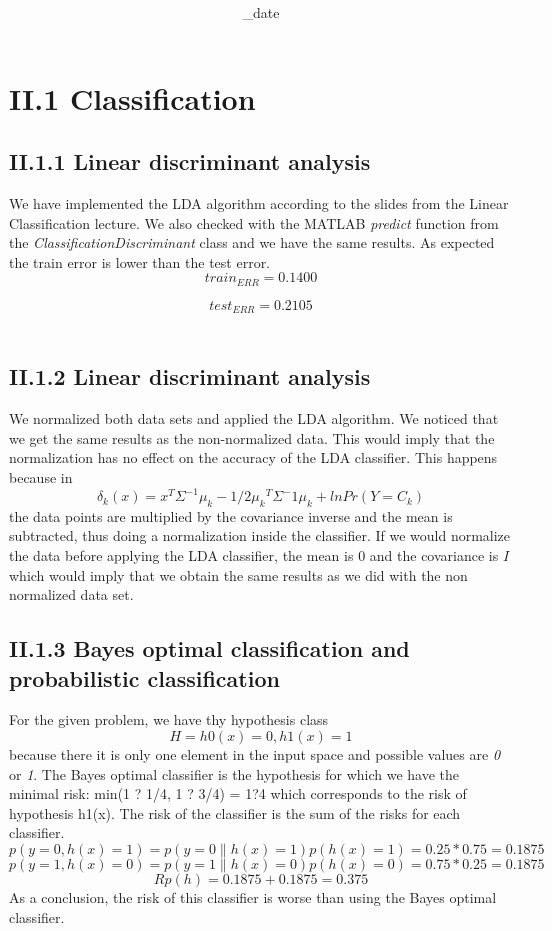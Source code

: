 \documentclass{article}      %
\title{\textbf{\Course}\\\textbf{\Exam}}
\author{\Studentname}
\date{\Sub_date}      %
\begin{document}

\maketitle                   %

\section*{II.1 Classification}
\subsection*{II.1.1 Linear discriminant analysis}

We have implemented the LDA algorithm according to the slides from the Linear Classification lecture. We also checked with the MATLAB \emph{predict} function from the \emph{ClassificationDiscriminant} class and we have the same results. As expected the train error is lower than the test error.\\

\[ 
train_{ERR} = 0.1400 \]

\[ 
test_{ERR} = 0.2105 
\] \\

\subsection*{II.1.2 Linear discriminant analysis}

We normalized both data sets and applied the LDA algorithm. We noticed that we get the same results as the non-normalized data. This would imply that the normalization has no effect on the accuracy of the LDA classifier. This happens because in \[ \delta_k(x) = x^T\Sigma^{-1}\mu_k - 1/2{\mu_k}^T\Sigma^-1\mu_k + ln{Pr( Y = C_k)}\] the data points are multiplied by the covariance inverse and the mean is subtracted, thus doing a normalization inside the classifier. If we would normalize the data before applying the LDA classifier, the mean is 0 and the covariance is $I$ which would imply that we obtain the same results as we did with the non normalized data set.

\subsection*{II.1.3 Bayes optimal classification and probabilistic classification}

For the given problem, we have thy hypothesis class 
\[H={h0(x)=0, h1(x)=1} \]
 because there it is only one element in the input space and possible values are \emph{0} or \emph{1}. The Bayes optimal classifier is the hypothesis for which we have the minimal risk: min({1 ? 1/4, 1 ? 3/4}) = 1?4 which corresponds to the risk of hypothesis h1(x). The risk of the classifier is the sum of the risks for each classifier. 
\[p(y=0, h(x)=1) = p(y=0 \| h(x)=1)p(h(x)=1) = 0.25 * 0.75 = 0.1875\] 
\[p(y=1, h(x)=0) = p(y=1 \| h(x)=0)p(h(x)=0) = 0.75 * 0.25 = 0.1875\] 
\[Rp(h) = 0.1875 + 0.1875 = 0.375\] 
As a conclusion, the risk of this classifier is worse than using the Bayes optimal classifier.\\
\end{document}
